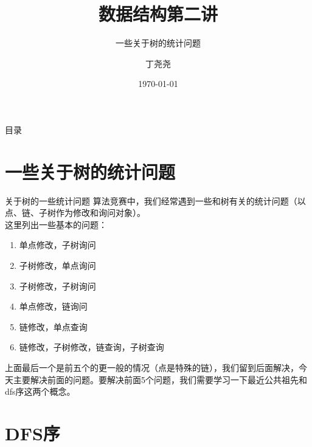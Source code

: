 \documentclass{beamer}
\title{数据结构第二讲}
\subtitle{一些关于树的统计问题}
\author{丁尧尧}
\institute{上海交通大学}
\date{\today}
\begin{document}
	\maketitle
	\begin{frame}{目录}
		\tableofcontents
	\end{frame}
	\section{一些关于树的统计问题}
		\begin{frame}{关于树的一些统计问题}
			算法竞赛中，我们经常遇到一些和树有关的统计问题（以点、链、子树作为修改和询问对象）。\\
			这里列出一些基本的问题：\\
			\begin{enumerate}
				\item 单点修改，子树询问
				\item 子树修改，单点询问
				\item 子树修改，子树询问
				\item 单点修改，链询问
				\item 链修改，单点查询
				\item 链修改，子树修改，链查询，子树查询
			\end{enumerate}
			上面最后一个是前五个的更一般的情况（点是特殊的链），我们留到后面解决，今天主要解决前面的问题。要解决前面5个问题，我们需要学习一下最近公共祖先和dfs序这两个概念。
		\end{frame}
	\section{DFS序}
\end{document}
